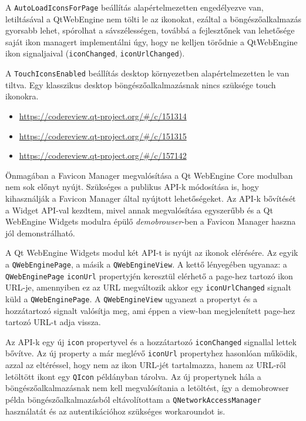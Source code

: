 \documentclass[12pt]{report}
\let\origurl\url
\renewcommand{\url}[1]{%
    \textcolor{blue}{\origurl{#1}}
}
\newcommand{\gerrit}[1]{%
    \textcolor{qtgreen}{\origurl{https://codereview.qt-project.org/\#/c/#1}}
}
\begin{document}
A \texttt{AutoLoadIconsForPage} beállítás alapértelmezetten engedélyezve van, letiltásával
a QtWebEngine nem tölti le az ikonokat, ezáltal a böngészőalkalmazás gyorsabb lehet,
spórolhat a sávszélességen, továbbá a fejlesztőnek van lehetősége saját ikon managert
implementálni úgy, hogy ne kelljen törődnie a QtWebEngine ikon signaljaival
(\texttt{iconChanged}, \texttt{iconUrlChanged}).

A \texttt{TouchIconsEnabled} beállítás desktop környezetben alapértelmezetten le van tiltva.
Egy klasszikus desktop böngészőalkalmazásnak nincs szüksége touch ikonokra.

\begin{center}
    \begin{reviewbox}
        \begin{itemize}
            \renewcommand{\labelitemi}{\textcolor{qtgreen}{$\blacktriangleright$}}
            \item \gerrit{151314}
            \item \gerrit{151315}
            \item \gerrit{157142}
        \end{itemize}
    \end{reviewbox}
\end{center}

Önmagában a Favicon Manager megvalósítása a Qt WebEngine Core modulban nem sok előnyt nyújt.
Szükséges a publikus API-k módosítása is, hogy kihasználják a Favicon Manager által nyújtott
lehetőségeket. Az API-k bővítését a Widget API-val kezdtem, mivel annak megvalósítása
egyszerűbb és a Qt WebEngine Widgets modulra épülő \textit{demobrowser}-ben a Favicon Manager
haszna jól demonstrálható.

A Qt WebEngine Widgets modul két API-t is nyújt az ikonok elérésére. Az egyik a
\texttt{QWebEnginePage}, a másik a \texttt{QWebEngineView}. A kettő lényegében ugyanaz:
a \texttt{QWebEnginePage} \texttt{iconUrl} propertyjén keresztül elérhető a page-hez
tartozó ikon URL-je, amennyiben ez az URL megváltozik akkor egy \texttt{iconUrlChanged}
signalt küld a \texttt{QWebEnginePage}. A \texttt{QWebEngineView} ugyanezt a propertyt és a
hozzátartozó signalt valósítja meg, ami éppen a view-ban megjelenített page-hez tartozó URL-t
adja vissza.

Az API-k egy új \texttt{icon} propertyvel és a hozzátartozó \texttt{iconChanged} signallal
lettek bővítve. Az új property a már meglévő \texttt{iconUrl} propertyhez hasonlóan működik,
azzal az eltéréssel, hogy nem az ikon URL-jét tartalmazza, hanem az URL-ről letöltött ikont
egy \texttt{QIcon} példányban tárolva. Az új propertynek hála a böngészőalkalmazásnak nem
kell megvalósítania a letöltést, így a demobrowser példa böngészőalkalmazásból
eltávolítottam a \texttt{QNetworkAccessManager} használatát és az autentikációhoz szükséges
workaroundot is.
\end{document}
